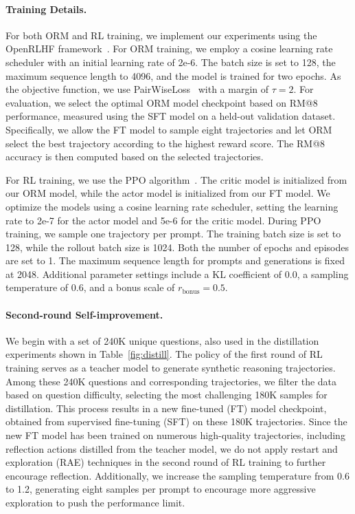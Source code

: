\paragraph{Training Details.}
For both ORM and RL training, we implement our experiments using the OpenRLHF framework~\cite{hu2024openrlhf}. For ORM training, we employ a cosine learning rate scheduler with an initial learning rate of 2e-6. The batch size is set to 128, the maximum sequence length to 4096, and the model is trained for two epochs. As the objective function, we use PairWiseLoss~\cite{christiano2017deep} with a margin of $\tau=2$. For evaluation, we select the optimal ORM model checkpoint based on RM@8 performance, measured using the SFT model on a held-out validation dataset. Specifically, we allow the FT model to sample eight trajectories and let ORM select the best trajectory according to the highest reward score. The RM@8 accuracy is then computed based on the selected trajectories.

For RL training, we use the PPO algorithm~\cite{ppo}. The critic model is initialized from our ORM model, while the actor model is initialized from our FT model. We optimize the models using a cosine learning rate scheduler, setting the learning rate to 2e-7 for the actor model and 5e-6 for the critic model. During PPO training, we sample one trajectory per prompt. The training batch size is set to 128, while the rollout batch size is 1024. Both the number of epochs and episodes are set to 1. The maximum sequence length for prompts and generations is fixed at 2048. Additional parameter settings include a KL coefficient of 0.0, a sampling temperature of 0.6, and a bonus scale of $r_{\text{bonus}}=0.5$.

\paragraph{Second-round Self-improvement.}
We begin with a set of 240K unique questions, also used in the distillation experiments shown in Table~\ref{fig:distill}. The policy of the first round of RL training serves as a teacher model to generate synthetic reasoning trajectories. Among these 240K questions and corresponding trajectories, we filter the data based on question difficulty, selecting the most challenging 180K samples for distillation. This process results in a new fine-tuned (FT) model checkpoint, obtained from supervised fine-tuning (SFT) on these 180K trajectories. Since the new FT model has been trained on numerous high-quality trajectories, including reflection actions distilled from the teacher model, we do not apply restart and exploration (RAE) techniques in the second round of RL training to further encourage reflection. Additionally, we increase the sampling temperature from 0.6 to 1.2, generating eight samples per prompt to encourage more aggressive exploration to push the performance limit.

